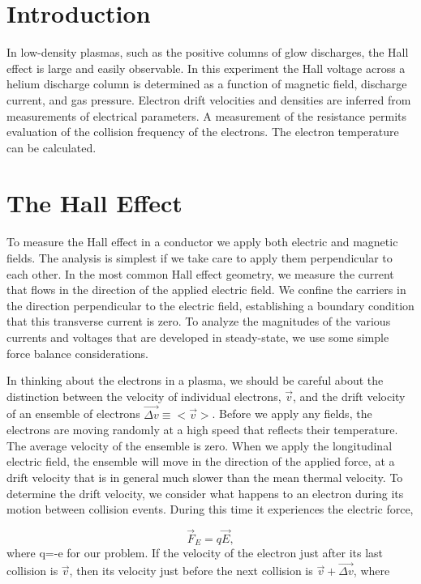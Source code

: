 \documentclass{../lab}
\begin{document}
\section{Introduction}

In low-density plasmas, such as the positive columns of glow discharges, the Hall effect is large and easily observable. In this experiment the Hall voltage across a helium discharge column is determined as a function of magnetic field, discharge current, and gas pressure. Electron drift velocities and densities are inferred from measurements of electrical parameters. A measurement of the resistance permits evaluation of the collision frequency of the electrons. The electron temperature can be calculated.

\section{The Hall Effect}

To measure the Hall effect in a conductor we apply both electric and magnetic fields. The analysis is simplest if we take care to apply them perpendicular to each other. In the most common Hall effect geometry, we measure the current that flows in the direction of the applied electric field. We confine the carriers in the direction perpendicular to the electric field, establishing a boundary condition that this transverse current is zero. To analyze the magnitudes of the various currents and voltages that are developed in steady-state, we use some simple force balance considerations.

In thinking about the electrons in a plasma, we should be careful about the distinction between the velocity of individual electrons, $ \vec {v}$, and the drift velocity of an ensemble of electrons $ \vec {\Delta v}\equiv <\vec {v}>$. Before we apply any fields, the electrons are moving randomly at a high speed that reflects their temperature. The average velocity of the ensemble is zero. When we apply the longitudinal electric field, the ensemble will move in the direction of the applied force, at a drift velocity that is in general much slower than the mean thermal velocity. To determine the drift velocity, we consider what happens to an electron during its motion between collision events. During this time it experiences the electric force,

\begin{equation}
    \vec {F}_{E}=q \vec {E},
\end{equation}
where q=-e for our problem. If the velocity of the electron just after its last collision is $ \vec {v}$, then its velocity just before the next collision is $ \vec {v}+\vec {\Delta v}$, where
\end{document}
